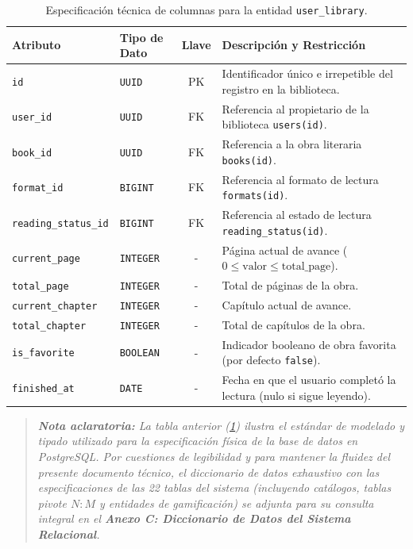 \documentclass[12pt, atypical, journal]{article}
\begin{document}
\begin{table}[H]
    \centering
    \footnotesize
    \begin{tabular}{|l|l|c|p{6.5cm}|}
        \hline
        \textbf{Atributo} & \textbf{Tipo de Dato} & \textbf{Llave} & \textbf{Descripción y Restricción} \\ \hline
        \texttt{id} & \texttt{UUID} & PK & Identificador único e irrepetible del registro en la biblioteca. \\ \hline
        \texttt{user\_id} & \texttt{UUID} & FK & Referencia al propietario de la biblioteca \texttt{users(id)}. \\ \hline
        \texttt{book\_id} & \texttt{UUID} & FK & Referencia a la obra literaria \texttt{books(id)}. \\ \hline
        \texttt{format\_id} & \texttt{BIGINT} & FK & Referencia al formato de lectura \texttt{formats(id)}. \\ \hline
        \texttt{reading\_status\_id} & \texttt{BIGINT} & FK & Referencia al estado de lectura \texttt{reading\_status(id)}. \\ \hline
        \texttt{current\_page} & \texttt{INTEGER} & - & Página actual de avance ($0 \le \mathrm{valor} \le \mathrm{total\_page}$). \\ \hline
        \texttt{total\_page} & \texttt{INTEGER} & - & Total de páginas de la obra. \\ \hline
        \texttt{current\_chapter} & \texttt{INTEGER} & - & Capítulo actual de avance. \\ \hline
        \texttt{total\_chapter} & \texttt{INTEGER} & - & Total de capítulos de la obra. \\ \hline
        \texttt{is\_favorite} & \texttt{BOOLEAN} & - & Indicador booleano de obra favorita (por defecto \texttt{false}). \\ \hline
        \texttt{finished\_at} & \texttt{DATE} & - & Fecha en que el usuario completó la lectura (nulo si sigue leyendo). \\ \hline
    \end{tabular}
    \caption{Especificación técnica de columnas para la entidad \texttt{user\_library}.}
    \label{tab:sample_data_dictionary}
\end{table}

\vspace{0.2cm}
\begin{quote}
\textit{\textbf{Nota aclaratoria:} La tabla anterior (\ref{tab:sample_data_dictionary}) ilustra el estándar de modelado y tipado utilizado para la especificación física de la base de datos en PostgreSQL. Por cuestiones de legibilidad y para mantener la fluidez del presente documento técnico, el diccionario de datos exhaustivo con las especificaciones de las 22 tablas del sistema (incluyendo catálogos, tablas pivote $N:M$ y entidades de gamificación) se adjunta para su consulta integral en el \textbf{Anexo C: Diccionario de Datos del Sistema Relacional}.}
\end{quote}
\end{document}

